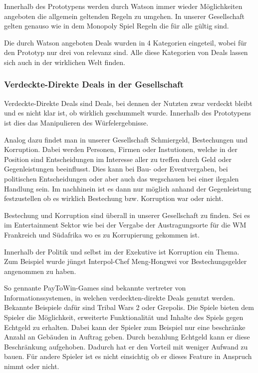 \documentclass[german]{cgspaper} %
\begin{document}
Innerhalb des Prototypens werden durch Watson immer wieder Möglichkeiten angeboten die allgemein geltenden Regeln zu umgehen.
In unserer Gesellschaft gelten genauso wie in dem Monopoly Spiel Regeln die für alle gültig sind.

Die durch Watson angeboten Deals wurden in 4 Kategorien eingeteil, wobei für den Prototyp nur drei von relevanz sind.
Alle diese Kategorien von Deals lassen sich auch in der wirklichen Welt finden.

\subsubsection{Verdeckte-Direkte Deals in der Gesellschaft}

Verdeckte-Direkte Deals sind Deals, bei dennen der Nutzten zwar verdeckt bleibt und es nicht klar ist, ob wirklich geschummelt wurde.
Innerhalb des Prototypens ist dies das Manipulieren des Würfelergebnisse. 

Analog dazu findet man in unserer Gesellschaft Schmiergeld, Bestechungen und Korruption.
Dabei werden Personen, Firmen oder Instutionen, welche in der Position sind Entscheidungen im Interesse aller zu treffen durch Geld oder Gegenleistungen beeinflusst.
Dies kann bei Bau- oder Eventvergaben, bei politischen Entscheidungen oder aber auch das wegschauen bei einer ilegalen Handlung sein.
Im nachhinein ist es dann nur möglich anhand der Gegenleistung festzustellen ob es wirklich Bestechung bzw. Korruption war oder nicht.

Bestechung und Korruption sind überall in unserer Gesellschaft zu finden.
Sei es im Entertainment Sektor wie bei der Vergabe der Austragungsorte für die WM Frankreich und Südafrika wo es zu Korrupierung gekommen ist. \cite{FAZWM2015}

Innerhalb der Politik und selbst im der Exekutive ist Korruption ein Thema.
Zum Beispiel wurde jüngst Interpol-Chef Meng-Hongwei vor Bestechungsgelder angenommen zu haben. \cite{NTVINTERPOL2018}

So gennante PayToWin-Games sind bekannte vertreter von Informationssystemen, in welchen verdeckten-direkte Deals genutzt werden.
Bekannte Beispiele dafür sind Tribal Wars 2 oder Grepolis.
Die Spiele bieten dem Spieler die Möglichkeit, erweiterte Funktionalität und Inhalte des Spiels gegen Echtgeld zu erhalten.
Dabei kann der Spieler zum Beispiel nur eine beschränke Anzahl an Gebäuden in Auftrag geben.
Durch bezahlung Echtgeld kann er diese Beschränkung aufgehoben.
Dadurch hat er den Vorteil mit weniger Aufwand zu bauen.
Für andere Spieler ist es nicht einsichtig ob er dieses Feature in Anspruch nimmt oder nicht.
\end{document}

